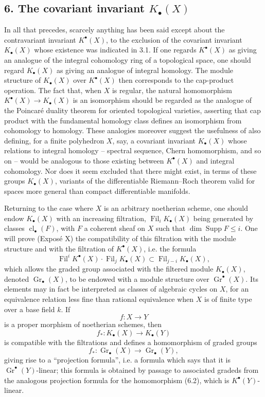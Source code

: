 \documentclass[11pt]{article}
\newcommand{\Gr}{\operatorname{Gr}}
\newcommand{\Fil}{\operatorname{Fil}}
\newcommand{\cl}{\operatorname{cl}}
\providecommand{\Gr}{\operatorname{Gr}}
\providecommand{\Gr}{\operatorname{G}}
\begin{document}
\subsection*{6. The covariant invariant $K_\bullet(X)$}
In all that precedes, scarcely anything has been said except about the contravariant invariant $K^\bullet(X)$, to the exclusion of the covariant invariant $K_\bullet(X)$ whose existence was indicated in 3.1. If one regards $K^\bullet(X)$ as giving an analogue of the integral cohomology ring of a topological space, one should regard $K_\bullet(X)$ as giving an analogue of integral homology. The module structure of $K_\bullet(X)$ over $K^\bullet(X)$ then corresponds to the cap-product operation. The fact that, when $X$ is regular, the natural homomorphism $K^\bullet(X)\to K_\bullet(X)$ is an isomorphism should be regarded as the analogue of the Poincar\'e duality theorem for oriented topological varieties, asserting that cap product with the fundamental homology class defines an isomorphism from cohomology to homology. These analogies moreover suggest the usefulness of also defining, for a finite polyhedron $X$, say, a covariant invariant $K_\bullet(X)$ whose relations to integral homology -- spectral sequence, Chern homomorphism, and so on -- would be analogous to those existing between $K^\bullet(X)$ and integral cohomology. Nor does it seem excluded that there might exist, in terms of these groups $K_\bullet(X)$, variants of the differentiable Riemann--Roch theorem valid for spaces more general than compact differentiable manifolds.

Returning to the case where $X$ is an arbitrary noetherian scheme, one should endow $K_\bullet(X)$ with an increasing filtration, $\Fil_iK_\bullet(X)$ being generated by classes $\cl_\bullet(F)$, with $F$ a coherent sheaf on $X$ such that $\dim \operatorname{Supp}F\le i$. One will prove (Expos\'e X) the compatibility of this filtration with the module structure and with the filtration of $K^\bullet(X)$, i.e. the formula
\begin{equation}\tag{6.1}
\Fil^iK^\bullet(X)\cdot \Fil_jK_\bullet(X)\subset \Fil_{j-i}K_\bullet(X),
\end{equation}
which allows the graded group associated with the filtered module $K_\bullet(X)$, denoted $\Gr_\bullet(X)$, to be endowed with a module structure over $\Gr^\bullet(X)$. Its elements may in fact be interpreted as classes of algebraic cycles on $X$, for an equivalence relation less fine than rational equivalence when $X$ is of finite type over a base field $k$. If
\[
f:X\longrightarrow Y
\]
is a proper morphism of noetherian schemes, then
\begin{equation}\tag{6.2}
f_*:K_\bullet(X)\longrightarrow K_\bullet(Y)
\end{equation}
is compatible with the filtrations and defines a homomorphism of graded groups
\begin{equation}\tag{6.3}
f_*:\Gr_\bullet(X)\longrightarrow \Gr_\bullet(Y),
\end{equation}
giving rise to a ``projection formula'', i.e. a formula which says that it is $\Gr^\bullet(Y)$-linear; this formula is obtained by passage to associated gradeds from the analogous projection formula for the homomorphism (6.2), which is $K^\bullet(Y)$-linear.
\end{document}
